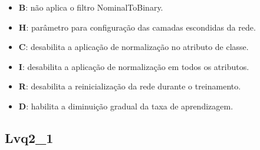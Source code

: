 \begin{enumerate}[a)]
\begin{itemize}

            \item \textbf{B}: não aplica o filtro NominalToBinary.

            \item \textbf{H}: parâmetro para configuração das camadas escondidas da rede.

            \item \textbf{C}: desabilita a aplicação de normalização no atributo de classe.

            \item \textbf{I}: desabilita a aplicação de normalização em todos os atributos.

            \item \textbf{R}: desabilita a reinicialização da rede durante o treinamento.

            \item \textbf{D}: habilita a diminuição gradual da taxa de aprendizagem.
        \end{itemize}
\end{enumerate}

\subsection{Lvq2\_1}

